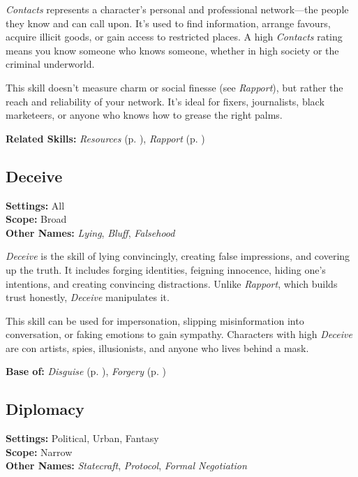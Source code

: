 \emph{Contacts} represents a character’s personal and professional network—the people they know and can call upon. It’s used to find information, arrange favours, acquire illicit goods, or gain access to restricted places. A high \emph{Contacts} rating means you know someone who knows someone, whether in high society or the criminal underworld.

This skill doesn’t measure charm or social finesse (see \emph{Rapport}), but rather the reach and reliability of your network. It’s ideal for fixers, journalists, black marketeers, or anyone who knows how to grease the right palms.

\vspace{0.5\baselineskip}
\noindent\textbf{Related Skills:} \emph{Resources} (p. \pageref{skill:resources}), \emph{Rapport} (p. \pageref{skill:rapport})


\subsection{Deceive}\label{skill:deceive}
\textbf{Settings:} All\\
\noindent\textbf{Scope:} Broad\\
\textbf{Other Names:} \emph{Lying}, \emph{Bluff}, \emph{Falsehood}\\
\vspace{\baselineskip}

\emph{Deceive} is the skill of lying convincingly, creating false impressions, and covering up the truth. It includes forging identities, feigning innocence, hiding one’s intentions, and creating convincing distractions. Unlike \emph{Rapport}, which builds trust honestly, \emph{Deceive} manipulates it.

This skill can be used for impersonation, slipping misinformation into conversation, or faking emotions to gain sympathy. Characters with high \emph{Deceive} are con artists, spies, illusionists, and anyone who lives behind a mask.

\vspace{0.5\baselineskip}
\noindent\textbf{Base of:} \emph{Disguise} (p. \pageref{skill:disguise}), \emph{Forgery} (p. \pageref{skill:forgery})



\subsection{Diplomacy}\label{skill:diplomacy}
\textbf{Settings:} Political, Urban, Fantasy\\
\textbf{Scope:} Narrow\\
\textbf{Other Names:} \emph{Statecraft}, \emph{Protocol}, \emph{Formal Negotiation}\\
\vspace{\baselineskip}

